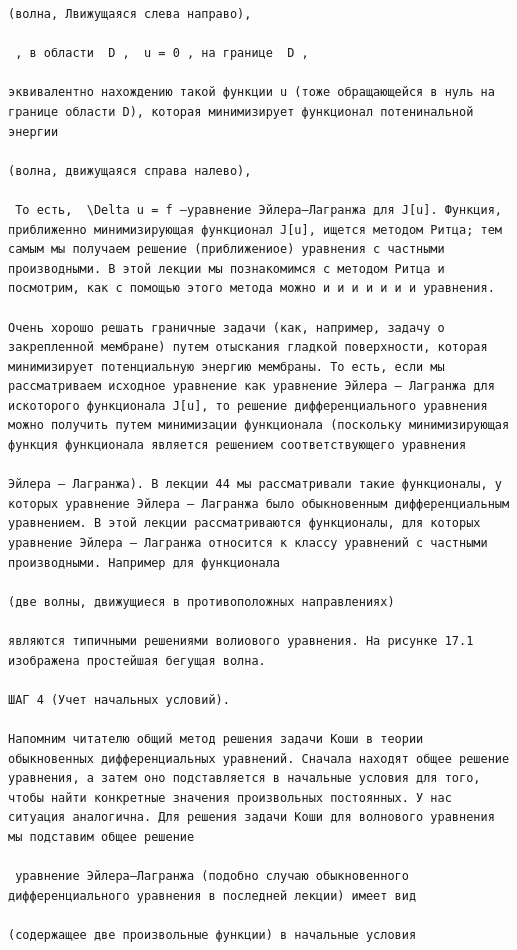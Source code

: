 \documentclass[
  ukrainian,
]{article}
\begin{document}
\begin{verbatim}
(волна, Лвижущаяся слева направо),

 , в области  D ,  u = 0 , на границе  D ,

эквивалентно нахождению такой функции u (тоже обращающейся в нуль на границе области D), которая минимизирует функционал потенинальной энергии

(волна, движущаяся справа налево),

 То есть,  \Delta u = f —уравнение Эйлера—Лагранжа для J[u]. Функция, приближенно минимизирующая функционал J[u], ищется методом Ритца; тем самым мы получаем решение (приближениое) уравнения с частными производными. В этой лекции мы познакомимся с методом Ритца и посмотрим, как с помощью этого метода можно и и и и и и и уравнения.

Очень хорошо решать граничные задачи (как, например, задачу о закрепленной мембране) путем отыскания гладкой поверхности, которая минимизирует потенциальную энергию мембраны. То есть, если мы рассматриваем исходное уравнение как уравнение Эйлера — Лагранжа для искоторого функционала J[u], то решение дифференциального уравнения можно получить путем минимизации функционала (поскольку минимизирующая функция функционала является решением соответствующего уравнения

Эйлера — Лагранжа). В лекции 44 мы рассматривали такие функционалы, у которых уравнение Эйлера — Лагранжа было обыкновенным дифференциальным уравнением. В этой лекции рассматриваются функционалы, для которых уравнение Эйлера — Лагранжа относится к классу уравнений с частными производными. Например для функционала

(две волны, движущиеся в противоположных направлениях)

являются типичными решениями волиового уравнения. На рисунке 17.1 изображена простейшая бегущая волна.

ШАГ 4 (Учет начальных условий).

Напомним читателю общий метод решения задачи Коши в теории обыкновенных дифференциальных уравнений. Сначала находят общее решение уравнения, а затем оно подставляется в начальные условия для того, чтобы найти конкретные значения произвольных постоянных. У нас ситуация аналогична. Для решения задачи Коши для волнового уравнения мы подставим общее решение

 уравнение Эйлера—Лагранжа (подобно случаю обыкновенного дифференциального уравнения в последней лекции) имеет вид

(содержащее две произвольные функции) в начальные условия


\end{verbatim}
\end{document}
